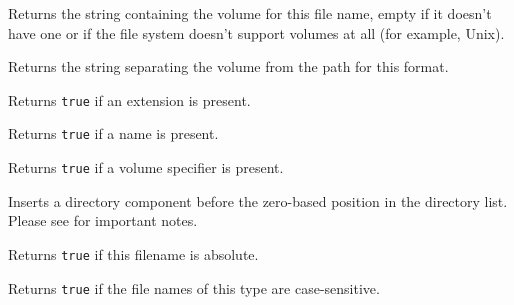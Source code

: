 \label{wxfilenamegetvolume}


Returns the string containing the volume for this file name, empty if it
doesn't have one or if the file system doesn't support volumes at all (for
example, Unix).


\label{wxfilenamegetvolumeseparator}


Returns the string separating the volume from the path for this format.


\label{wxfilenamehasext}


Returns {\tt true} if an extension is present.


\label{wxfilenamehasname}


Returns {\tt true} if a name is present.


\label{wxfilenamehasvolume}


Returns {\tt true} if a volume specifier is present.


\label{wxfilenameinsertdir}


Inserts a directory component before the zero-based position in the directory
list. Please see  for important notes.


\label{wxfilenameisabsolute}


Returns {\tt true} if this filename is absolute.


\label{wxfilenameiscasesensitive}


Returns {\tt true} if the file names of this type are case-sensitive.


